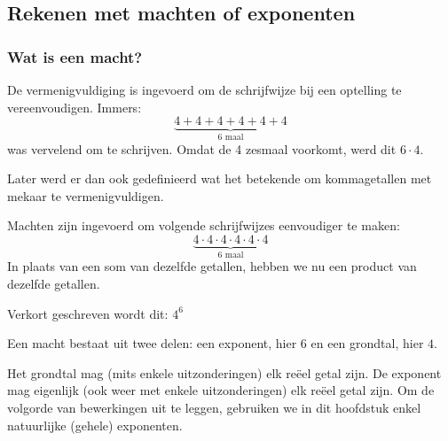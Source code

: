 \subsection{Rekenen met machten of exponenten}
\subsubsection{Wat is een macht?}
De vermenigvuldiging is ingevoerd om de schrijfwijze bij een optelling te vereenvoudigen. Immers:
\begin{equation*}
\underbrace{4+4+4+4+4+4}_{\text{6 maal}}
\end{equation*}
was vervelend om te schrijven. Omdat de 4 zesmaal voorkomt, werd dit $6 \cdot 4$.

Later werd er dan ook gedefinieerd wat het betekende om kommagetallen met mekaar te vermenigvuldigen.

Machten zijn ingevoerd om volgende schrijfwijzes eenvoudiger te maken:
\begin{equation*}
\underbrace{4 \cdot 4\cdot4\cdot4\cdot4\cdot4}_{\text{6 maal}}
\end{equation*}
In plaats van een som van dezelfde getallen, hebben we nu een product van dezelfde getallen.

Verkort geschreven wordt dit: $4^6$

Een macht bestaat uit twee delen: een exponent, hier $6$ en een grondtal, hier $4$.

Het grondtal mag (mits enkele uitzonderingen) elk re\"eel getal zijn. De exponent mag eigenlijk (ook weer met enkele uitzonderingen) elk re\"eel getal zijn. Om de volgorde van bewerkingen uit te leggen, gebruiken we in dit hoofdstuk enkel natuurlijke (gehele) exponenten.

